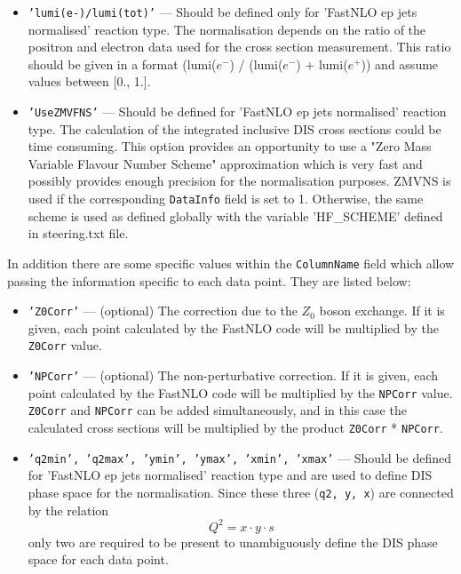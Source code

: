\begin{itemize}
   \item {\tt 'lumi(e-)/lumi(tot)'} --- Should be defined only for 'FastNLO ep jets normalised'
         reaction type. The normalisation depends on the ratio of the positron and electron data 
         used for the cross section measurement. This ratio should  be
         given in a format (lumi($e^-$) / (lumi($e^-$) + lumi($e^+$)) and assume values between [0., 1.].

   \item {\tt 'UseZMVFNS'} --- Should be defined for 'FastNLO ep jets normalised' reaction type. The calculation
         of the integrated inclusive DIS cross sections could be time consuming.
         This option provides an opportunity to use a "Zero Mass Variable Flavour
         Number Scheme" approximation which is very fast and possibly provides
         enough precision for the normalisation purposes. ZMVNS is used if 
         the corresponding {\tt DataInfo} field is set to 1. Otherwise, the same scheme
         is used as defined globally with the variable 'HF\_SCHEME' defined in steering.txt file.
\end{itemize}


In addition there are some specific values within the {\tt ColumnName} field which allow
passing the information specific to each data point. They are listed below:

\begin{itemize}
     \item{\tt 'Z0Corr'} --- (optional) The correction due to the $Z_0$ boson exchange.
                 If it is given, each point calculated by the FastNLO code will be
                 multiplied by the {\tt Z0Corr} value.

     \item{\tt 'NPCorr'} --- (optional) The non-perturbative correction.
                 If it is given, each point calculated by the FastNLO code will be
                 multiplied by the {\tt NPCorr} value. {\tt Z0Corr} and {\tt NPCorr} can be added 
                 simultaneously, and in this case the calculated cross sections
                 will be multiplied by the product {\tt Z0Corr} * {\tt NPCorr}.

    \item{\tt 'q2min', 'q2max', 'ymin', 'ymax', 'xmin', 'xmax'} --- Should be defined for 
         'FastNLO ep jets normalised' reaction type and are used to define 
         DIS phase space for the normalisation. Since these three ({\tt q2, y, x}) are 
         connected by the relation
         \begin{equation}
              Q^2 = x \cdot y \cdot s
         \end{equation}
         only two are required to be present to unambiguously define the DIS phase space for each data point.
        
\end{itemize}



